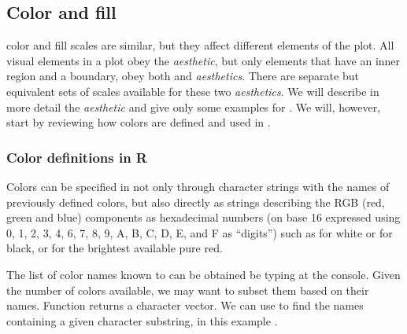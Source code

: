 \documentclass[krantz2]{krantz}\usepackage{knitr}
\begin{document}
\subsection{Color and fill}

color and fill scales are similar, but they affect different elements of the plot. All visual elements in a plot obey the  \emph{aesthetic}, but only elements that have an inner region and a boundary, obey both  and  \emph{aesthetics}. There are separate but equivalent sets of scales available for these two \emph{aesthetics}. We will describe in more detail the  \emph{aesthetic} and give only some examples for . We will, however, start by reviewing how colors are defined and used in \Rlang.

%
%


\subsubsection{Color definitions in R}\label{sec:plot:colors}
Colors can be specified in \Rlang not only through character strings with the names of previously defined colors, but also directly as strings describing the RGB (red, green and blue) components as hexadecimal numbers (on base 16 expressed using 0, 1, 2, 3, 4, 6, 7, 8, 9, A, B, C, D, E, and F as ``digits'') such as  for white or  for black, or  for the brightest available pure red.

The list of color names known to \Rlang can be obtained be typing  at the \Rlang console.
Given the number of colors available, we may want to subset them based on their names. Function  returns a character vector. We can use  to find the names containing a given character substring, in this example .
\end{document}
